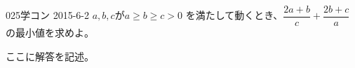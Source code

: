 \begin{thm}{025}{}{学コン 2015-6-2}
 $a,b,c$が$a \ge b \ge c > 0$ を満たして動くとき、$\dfrac{2a+b}{c}+\dfrac{2b+c}{a}$の最小値を求めよ。
\end{thm}

ここに解答を記述。